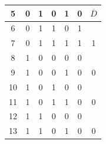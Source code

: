 \begin{center}
\begin{tabular}{ccccccc}
\multicolumn{1}{c|}{5}                           & 0                         & 1                         & 0                         & \multicolumn{1}{c|}{1}                         & \multicolumn{1}{c|}{0}                             & \multirow{-2}{*}{$\overline{D}$} \\ \hline
\multicolumn{1}{c|}{6}                           & 0                         & 1                         & 1                         & \multicolumn{1}{c|}{0}                         & \multicolumn{1}{c|}{1}                             &                                  \\
\multicolumn{1}{c|}{7}                           & 0                         & 1                         & 1                         & \multicolumn{1}{c|}{1}                         & \multicolumn{1}{c|}{1}                             & \multirow{-2}{*}{1}              \\ \hline
\multicolumn{1}{c|}{8}                           & 1                         & 0                         & 0                         & \multicolumn{1}{c|}{0}                         & \multicolumn{1}{c|}{0}                             &                                  \\
\multicolumn{1}{c|}{9}                           & 1                         & 0                         & 0                         & \multicolumn{1}{c|}{1}                         & \multicolumn{1}{c|}{0}                             & \multirow{-2}{*}{0}              \\ \hline
\multicolumn{1}{c|}{10}                          & 1                         & 0                         & 1                         & \multicolumn{1}{c|}{0}                         & \multicolumn{1}{c|}{0}                             &                                  \\
\multicolumn{1}{c|}{11}                          & 1                         & 0                         & 1                         & \multicolumn{1}{c|}{1}                         & \multicolumn{1}{c|}{0}                             & \multirow{-2}{*}{0}              \\ \hline
\multicolumn{1}{c|}{12}                          & 1                         & 1                         & 0                         & \multicolumn{1}{c|}{0}                         & \multicolumn{1}{c|}{0}                             &                                  \\
\multicolumn{1}{c|}{13}                          & 1                         & 1                         & 0                         & \multicolumn{1}{c|}{1}                         & \multicolumn{1}{c|}{0}                             & \multirow{-2}{*}{0}              \\ \hline

\end{tabular}
\end{center}
